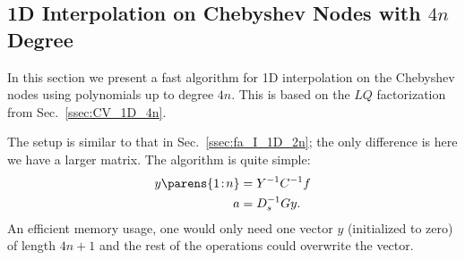 \subsection{1D Interpolation on Chebyshev Nodes with $4n$ Degree}
\label{ssec:fa_I_1D_4n}

In this section we present a fast algorithm for 1D interpolation
on the Chebyshev nodes using polynomials up to degree $4n$.
This is based on the $LQ$ factorization from Sec.~\ref{ssec:CV_1D_4n}.

The setup is similar to that in Sec.~\ref{ssec:fa_I_1D_2n};
the only difference is here we have a larger \CV{} matrix.
The algorithm is quite simple:
%
\begin{align}
    y\parens{1\!:\!n} &= Y^{-1}C^{-1}f \nonumber\\
    a &= D_{s}^{-1}Gy.
\end{align}
%
An efficient memory usage, one would only need one vector
$y$ (initialized to zero) of length $4n+1$
and the rest of the operations could overwrite the vector.



